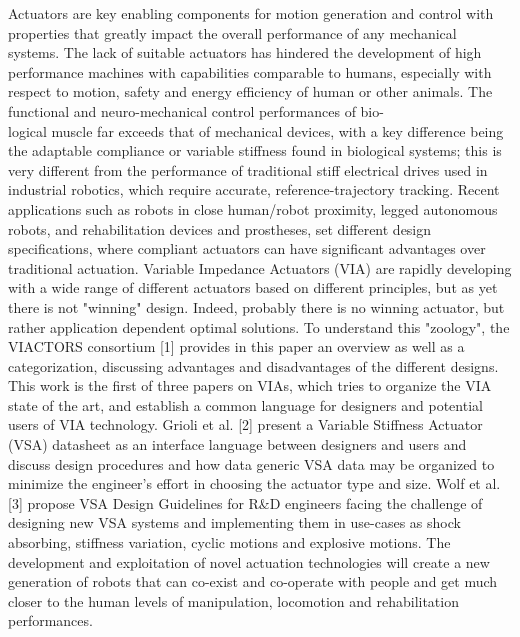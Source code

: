 \documentclass[10pt]{article}
\begin{document}
Actuators are key enabling components for motion generation and control with properties that greatly impact the overall performance of any mechanical systems. The lack of suitable actuators has hindered the development of high performance machines with capabilities comparable to humans, especially with respect to motion, safety and energy efficiency of human or other animals. The functional and neuro-mechanical control performances of bio-\\[0pt]
logical muscle far exceeds that of mechanical devices, with a key difference being the adaptable compliance or variable stiffness found in biological systems; this is very different from the performance of traditional stiff electrical drives used in industrial robotics, which require accurate, reference-trajectory tracking. Recent applications such as robots in close human/robot proximity, legged autonomous robots, and rehabilitation devices and prostheses, set different design specifications, where compliant actuators can have significant advantages over traditional actuation. Variable Impedance Actuators (VIA) are rapidly developing with a wide range of different actuators based on different principles, but as yet there is not "winning" design. Indeed, probably there is no winning actuator, but rather application dependent optimal solutions. To understand this "zoology", the VIACTORS consortium [1] provides in this paper an overview as well as a categorization, discussing advantages and disadvantages of the different designs. This work is the first of three papers on VIAs, which tries to organize the VIA state of the art, and establish a common language for designers and potential users of VIA technology. Grioli et al. [2] present a Variable Stiffness Actuator (VSA) datasheet as an interface language between designers and users and discuss design procedures and how data generic VSA data may be organized to minimize the engineer's effort in choosing the actuator type and size. Wolf et al. [3] propose VSA Design Guidelines for R\&D engineers facing the challenge of designing new VSA systems and implementing them in use-cases as shock absorbing, stiffness variation, cyclic motions and explosive motions. The development and exploitation of novel actuation technologies will create a new generation of robots that can co-exist and co-operate with people and get much closer to the human levels of manipulation, locomotion and rehabilitation performances.
\end{document}
